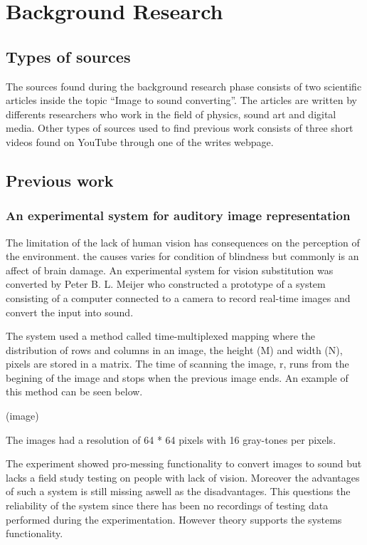 \chapter{Background Research}\label{ch:bgresearch}



\section{Types of sources}\label{sec:typesofsources} 
The sources found during the background research phase consists of two scientific articles inside the topic “Image to sound converting”. The articles are written by differents researchers who work in the field of physics, sound art and digital media. Other types of sources used to find previous work consists of three short videos found on YouTube through one of the writes webpage. 


\section{Previous work}\label{sec:previouswork}

\subsection{An experimental system for auditory image representation}\label{sec:experimentalsystem}

The limitation of the lack of human vision has consequences on the perception of the environment. the causes varies for condition of blindness but commonly is an affect of brain damage. An experimental system for vision substitution was converted by Peter B. L. Meijer who constructed a prototype of a system consisting of a computer connected to a camera to record real-time images and convert the input into sound. 

The system used a method called time-multiplexed mapping where the distribution of rows and columns in an image, the height (M) and width (N), pixels are stored in a matrix. The time of scanning the image, r, runs from the begining of the image and stops when the previous image ends. An example of this method can be seen below. 

(image)
  
The images had a resolution of 64 * 64 pixels with 16 gray-tones per pixels.  

The experiment showed pro-messing functionality to convert images to sound but lacks a field study testing on people with lack of vision. Moreover the advantages of such a system is still missing aswell as the disadvantages. This questions the reliability of the system since there has been no recordings of testing data performed during the experimentation. However theory supports the systems functionality.     

